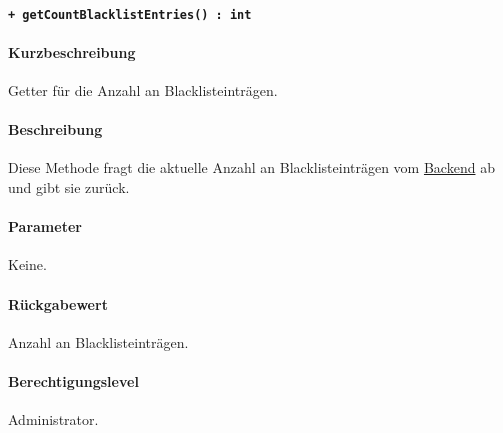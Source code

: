 \paragraph{\texttt{+ getCountBlacklistEntries() : int}}\label{AP_Framework_getCountBlacklistEntries}%
\paragraph*{Kurzbeschreibung}
Getter für die Anzahl an Blacklisteinträgen.
\paragraph*{Beschreibung}
Diese Methode fragt die aktuelle Anzahl an Blacklisteinträgen vom \hyperref[AP_Backend]{Backend} ab und gibt sie zurück.
\paragraph*{Parameter}
Keine.
\paragraph*{Rückgabewert}
Anzahl an Blacklisteinträgen.
\paragraph*{Berechtigungslevel}
Administrator.
